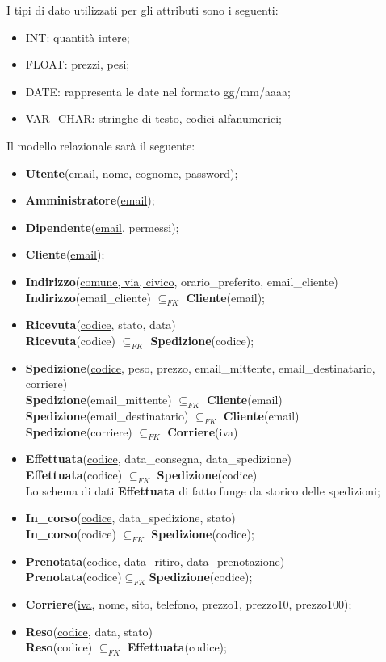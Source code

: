 I tipi di dato utilizzati per gli attributi sono i seguenti:
\begin{itemize}
  \item INT: quantità intere;
  \item FLOAT: prezzi, pesi;
  \item DATE: rappresenta le date nel formato gg/mm/aaaa;
  \item VAR\_CHAR: stringhe di testo, codici alfanumerici;
\end{itemize}

Il modello relazionale sarà il seguente:
\begin{itemize}
  \item \textbf{Utente}(\underline{email}, nome, cognome, password);
  \item \textbf{Amministratore}(\underline{email});
  \item \textbf{Dipendente}(\underline{email}, permessi);
  \item \textbf{Cliente}(\underline{email});
  \item \textbf{Indirizzo}(\underline{comune, via, civico}, orario\_preferito, email\_cliente) \\ \textbf{Indirizzo}(email\_cliente) $\subseteq _{FK}$ \textbf{Cliente}(email); 
  \item \textbf{Ricevuta}(\underline{codice}, stato, data)\\ \textbf{Ricevuta}(codice) $\subseteq _{FK}$ \textbf{Spedizione}(codice);
  \item \textbf{Spedizione}(\underline{codice}, peso, prezzo, email\_mittente, email\_destinatario, corriere) \\ \textbf{Spedizione}(email\_mittente) $\subseteq _{FK}$ \textbf{Cliente}(email) \\ \textbf{Spedizione}(email\_destinatario) $\subseteq _{FK}$ \textbf{Cliente}(email) \\ \textbf{Spedizione}(corriere) $\subseteq _{FK}$ \textbf{Corriere}(iva)
  \item \textbf{Effettuata}(\underline{codice}, data\_consegna, data\_spedizione)\\\textbf{Effettuata}(codice) $\subseteq _{FK}$ \textbf{Spedizione}(codice) \\ Lo schema di dati \textbf{Effettuata} di fatto funge da storico delle spedizioni;
  \item \textbf{In\_corso}(\underline{codice}, data\_spedizione, stato) \\ \textbf{In\_corso}(codice) $\subseteq _{FK}$ \textbf{Spedizione}(codice);
  \item \textbf{Prenotata}(\underline{codice}, data\_ritiro, data\_prenotazione) \\ \textbf{Prenotata}(codice)$\subseteq _{FK}$\textbf{Spedizione}(codice);
  \item \textbf{Corriere}(\underline{iva}, nome, sito, telefono, prezzo1, prezzo10, prezzo100);
  \item \textbf{Reso}(\underline{codice}, data, stato)\\ \textbf{Reso}(codice) $\subseteq _{FK}$ \textbf{Effettuata}(codice);
\end{itemize}

